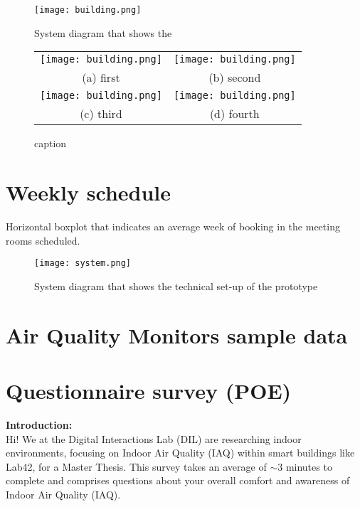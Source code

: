\begin{appendices}
\begin{figure}[H]
\begin{minipage}{.5\textwidth}
    \centering
    \texttt{[image: building.png]}
    \caption{System diagram that shows the }
    \label{fig:timeline}
\end{minipage}%
\begin{minipage}{.5\textwidth}
\begin{tabular}{cc}
  \texttt{[image: building.png]} &   \texttt{[image: building.png]} \\
(a) first & (b) second \\[6pt]
 \texttt{[image: building.png]} &   \texttt{[image: building.png]} \\
(c) third & (d) fourth \\[6pt]
\end{tabular}
\caption{caption}
\end{minipage}%
\end{figure}

\section{Weekly schedule}
\label{appendix:schedule}

Horizontal boxplot that indicates an average week of booking in the meeting rooms scheduled.

\begin{figure}[H]
    \centering
    \texttt{[image: system.png]}
    \caption{System diagram that shows the technical set-up of the prototype}
    \label{fig:timeline}
\end{figure}

\pagebreak

\section{Air Quality Monitors sample data}
\label{appendix:monitors}

\section{Questionnaire survey (POE)}
\label{appendix:survey}

\textbf{Introduction:}\\

Hi! We at the Digital Interactions Lab (DIL) are researching indoor environments, focusing on Indoor Air Quality (IAQ) within smart buildings like Lab42, for a Master Thesis. This survey takes an average of $\sim$3 minutes to complete and comprises questions about your overall comfort and awareness of Indoor Air Quality (IAQ).


\end{appendices}
